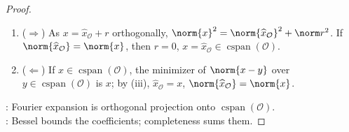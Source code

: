 \begin{theorem}
\begin{proof}
\begin{enumerate}[label=(\roman*)]
\item[$(iv)$] ($\Rightarrow$) As $x=\widehat{x}_{\mathcal O}+r$ orthogonally, $\norm{x}^2=\norm{\widehat{x}_{\mathcal O}}^2+\norm r^2$. If $\norm{\widehat{x}_{\mathcal O}}=\norm{x}$, then $r=0$, $x=\widehat{x}_{\mathcal O}\in\operatorname{cspan}(\mathcal O)$.
\item[$(iv)$] ($\Leftarrow$) If $x\in\operatorname{cspan}(\mathcal O)$, the minimizer of $\norm{x-y}$ over $y\in\operatorname{cspan}(\mathcal O)$ is $x$; by (iii), $\widehat{x}_{\mathcal O}=x$, $\norm{\widehat{x}_{\mathcal O}}=\norm{x}$.
\end{enumerate}
: Fourier expansion is orthogonal projection onto $\operatorname{cspan}(\mathcal O)$.\\
: Bessel bounds the coefficients; completeness sums them.
\end{proof}
\end{theorem}

